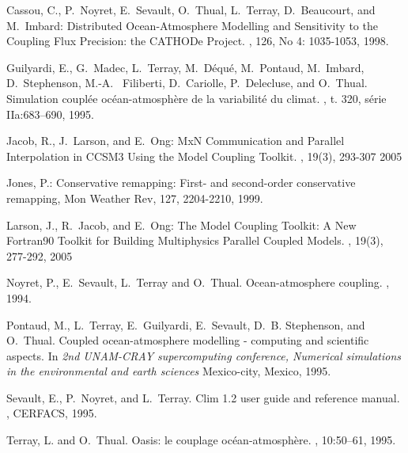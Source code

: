 \newpage
\begin{thebibliography}{10}
\vspace{-0.3cm}
Cassou, C., P.~Noyret, E.~Sevault, O.~Thual, L.~Terray, D.~Beaucourt, and
  M.~Imbard:
\newblock Distributed Ocean-Atmosphere Modelling and Sensitivity to the
  Coupling Flux Precision: the CATHODe Project.
, 126, No 4: 1035-1053, 1998.

Guilyardi, E., G.~Madec, L.~Terray, M.~D\'equ\'e, M.~Pontaud, M.~Imbard, D.~Stephenson, M.-A. ~Filiberti, D.~Cariolle, P.~Delecluse, and O.~Thual. 
\newblock Simulation coupl\'ee oc\'ean-atmosph\`ere de la variabilit\'e du climat.
, t. 320, s\'erie IIa:683--690, 1995. 

Jacob, R., J.~Larson, and E.~Ong:
\newblock MxN Communication and Parallel Interpolation in CCSM3 Using the Model Coupling Toolkit.
, 19(3), 293-307 2005

Jones, P.: Conservative remapping: First- and second-order conservative
  remapping, Mon Weather Rev, 127, 2204-2210, 1999. 

Larson, J., R.~Jacob, and E.~Ong:
\newblock The Model Coupling Toolkit: A New Fortran90 Toolkit for Building Multiphysics Parallel Coupled Models.
, 19(3), 277-292, 2005

Noyret, P., E.~Sevault, L.~Terray and O.~Thual.
\newblock Ocean-atmosphere coupling. 
,
1994.

Pontaud, M., L.~Terray, E.~Guilyardi, E.~Sevault, D.~B. Stephenson, and
  O.~Thual.
\newblock Coupled ocean-atmosphere modelling - computing and scientific
  aspects.
\newblock In {\em 2nd UNAM-CRAY supercomputing conference, Numerical
  simulations in the environmental and earth sciences}
\newblock Mexico-city, Mexico, 1995.

Sevault, E., P.~Noyret, and L.~Terray.
\newblock Clim 1.2 user guide and reference manual.
, CERFACS, 1995.

Terray, L. and O.~Thual.
\newblock Oasis: le couplage oc\'ean-atmosph\`ere.
, 10:50--61, 1995.


\end{thebibliography}
